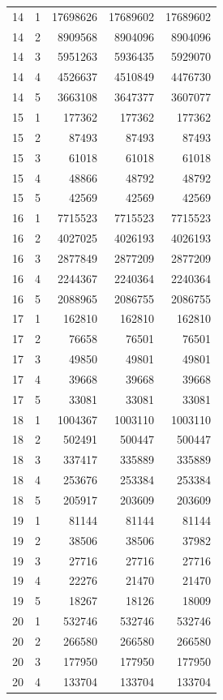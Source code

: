 \begin{longtable}{rrrrr}
14 & 1 & 17698626 & 17689602 & 17689602 \\
14 & 2 & 8909568 & 8904096 & 8904096 \\
14 & 3 & 5951263 & 5936435 & 5929070 \\
14 & 4 & 4526637 & 4510849 & 4476730 \\
14 & 5 & 3663108 & 3647377 & 3607077 \\
15 & 1 & 177362 & 177362 & 177362 \\
15 & 2 & 87493 & 87493 & 87493 \\
15 & 3 & 61018 & 61018 & 61018 \\
15 & 4 & 48866 & 48792 & 48792 \\
15 & 5 & 42569 & 42569 & 42569 \\
16 & 1 & 7715523 & 7715523 & 7715523 \\
16 & 2 & 4027025 & 4026193 & 4026193 \\
16 & 3 & 2877849 & 2877209 & 2877209 \\
16 & 4 & 2244367 & 2240364 & 2240364 \\
16 & 5 & 2088965 & 2086755 & 2086755 \\
17 & 1 & 162810 & 162810 & 162810 \\
17 & 2 & 76658 & 76501 & 76501 \\
17 & 3 & 49850 & 49801 & 49801 \\
17 & 4 & 39668 & 39668 & 39668 \\
17 & 5 & 33081 & 33081 & 33081 \\
18 & 1 & 1004367 & 1003110 & 1003110 \\
18 & 2 & 502491 & 500447 & 500447 \\
18 & 3 & 337417 & 335889 & 335889 \\
18 & 4 & 253676 & 253384 & 253384 \\
18 & 5 & 205917 & 203609 & 203609 \\
19 & 1 & 81144 & 81144 & 81144 \\
19 & 2 & 38506 & 38506 & 37982 \\
19 & 3 & 27716 & 27716 & 27716 \\
19 & 4 & 22276 & 21470 & 21470 \\
19 & 5 & 18267 & 18126 & 18009 \\
20 & 1 & 532746 & 532746 & 532746 \\
20 & 2 & 266580 & 266580 & 266580 \\
20 & 3 & 177950 & 177950 & 177950 \\
20 & 4 & 133704 & 133704 & 133704 \\

\end{longtable}
